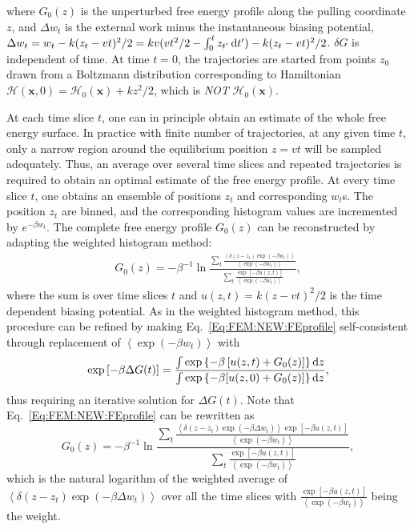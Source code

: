 where $G_0(z)$ is the unperturbed free energy profile along the pulling coordinate $z$, and $\Delta w_t$ is the external work minus the instantaneous biasing potential, $\Delta w_t=w_t-k(z_t-vt)^2/2=kv(vt^2/2-\int_0^t z_{t^\prime}\mathop{}\!\mathrm{d} t^\prime)-k(z_t-vt)^2/2$. %
$\delta G$ is independent of time.
At time $t=0$, the trajectories are started from points $z_0$ drawn from a Boltzmann distribution corresponding to Hamiltonian $\mathscr{H}(\mathbf{x},0)=\mathscr{H}_0(\mathbf{x})+kz^2/2$, which is \emph{NOT} $\mathscr{H}_0(\mathbf{x})$.

At each time slice $t$, one can in principle obtain an estimate of the whole free energy surface. In practice with finite number of trajectories, at any given time $t$, only a narrow region around the equilibrium position $z=vt$ will be sampled adequately. Thus, an average over several time slices and repeated trajectories is required to obtain an optimal estimate of the free energy profile. At every time slice $t$, one obtains an ensemble of positions $z_t$ and corresponding $w_t$s. The position $z_t$ are binned, and the corresponding histogram values are incremented by $e^{-\beta w_t}$. The complete free energy profile $G_0(z)$ can be reconstructed by adapting the weighted histogram method:
\begin{align}
	G_0(z)=-\beta^{-1}\ln{\frac{\sum_t \frac{\left<\delta(z-z_t)\exp{(-\beta w_t)}\right>}{\left<\exp{(-\beta w_t)}\right>}}{\sum_t\frac{\exp{[-\beta u(z,t)]}}{\left<\exp{(-\beta w_t)}\right>}}},
	\label{Eq:FEM:NEW:FEprofile}
\end{align}
where the sum is over time slices $t$ and $u(z,t)=k(z-vt)^2/2$ is the time dependent biasing potential. As in the weighted histogram method, this procedure can be refined by making Eq.~\ref{Eq:FEM:NEW:FEprofile} self-consistent through replacement of $\left<\exp{(-\beta w_t)}\right>$ with
\begin{equation}
	\exp{[-\beta \Delta G(t)]}=\frac{\int \exp{\left\{-\beta \left[u(z,t)+G_0(z)\right]\right\}}\mathop{}\!\mathrm{d} z}{\int \exp{\left\{-\beta[u(z,0)+G_0(z)]\right\}\mathop{}\!\mathrm{d}z}},
\end{equation}
thus requiring an iterative solution for $\Delta G(t)$. Note that Eq.~\ref{Eq:FEM:NEW:FEprofile} can be rewritten as
\begin{equation}
	G_0(z)=-\beta^{-1}\ln{\frac{\sum_t \frac{\left<\delta(z-z_t)\exp{(-\beta \Delta w_t)}\right>\exp{[-\beta u(z,t)]}}{\left<\exp{(-\beta w_t)}\right>}}{\sum_t\frac{\exp{[-\beta u(z,t)]}}{\left<\exp{(-\beta w_t)}\right>}}},
\end{equation}
which is the natural logarithm of the weighted average of $\left<\delta(z-z_t)\exp{(-\beta \Delta w_t)}\right>$ over all the time slices with $\frac{\exp{[-\beta u(z,t)]}}{\left<\exp{(-\beta w_t)}\right>}$ being the weight.